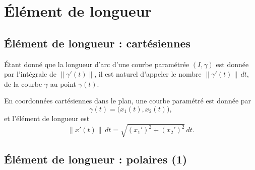 \section{Élément de longueur}

\subsection{Élément de longueur : cartésiennes}

Étant donné que la longueur d'arc d'une courbe paramétrée $(I,\gamma)$ est donnée par l'intégrale de $\| \gamma'(t) \|$, il est naturel d'appeler le nombre $\| \gamma'(t) \|\,dt$,  de la courbe $\gamma$ au point $\gamma(t)$.

En coordonnées cartésiennes dans le plan, une courbe paramétré est donnée par
\begin{equation}
    \gamma(t)=\big( x_1(t),x_2(t) \big),
\end{equation}
et l'élément de longueur est
\begin{equation}        \label{EqElLongCart}
    \| x'(t) \|\, dt =\sqrt{(x_1')^2+(x_2')^2} \, dt.
\end{equation}

\subsection{Élément de longueur : polaires (1)}

